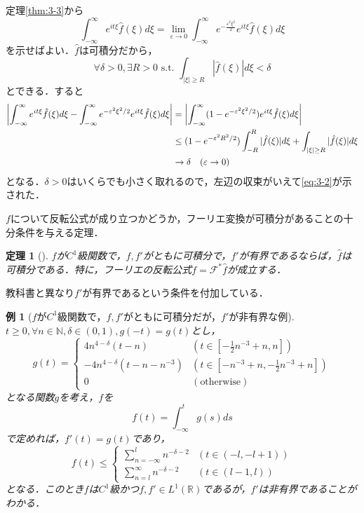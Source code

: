 \documentclass[dvipdfmx,a4j,10pt]{jsarticle}
\makeatletter
\theoremstyle{mystyle1}
\newtheorem{theorem}{定理}[section]
\theoremstyle{mystyle3}
\theoremstyle{mystyle4}
\theoremstyle{mystyle6}
\theoremstyle{mystyle2}
\newtheorem{ex*}{例}
\theoremstyle{mystyle5}
\renewenvironment{proof}[1][\proofname]{\par
  \pushQED{\qed}%
  \normalfont
  \topsep6\p@\@plus6\p@ \trivlist
  \item[\hskip\labelsep{\bfseries\sffamily #1}]\ignorespaces
}{%
  \popQED\endtrivlist\@endpefalse
}
\renewcommand\proofname{証明}
\newenvironment{thm}[1][]
{\begin{tcolorbox}[
    enhanced,
    boxrule=0pt,
    arc=0mm,
    frame hidden,
    borderline west={2pt}{-4pt}{red},
    breakable = true
    ]
    \begin{theorem}[#1]
}
{\end{theorem}\end{tcolorbox}}
\makeatother
\begin{document}
\begin{proof}
	定理\ref{thm:3-3}から
	\begin{equation}\label{eq:3-2}
		\int_{-\infty}^\infty e^{it\xi}\hat f(\xi)d\xi=\lim_{\varepsilon\to 0}\int_{-\infty}^\infty e^{-\frac{\varepsilon^2\xi^2}{2}}e^{it\xi}\hat{f}(\xi)d\xi
	\end{equation}
	を示せばよい．$\hat f$は可積分だから，
	\[
		\forall\delta>0,\exists R>0\,\,\textrm{s.t.}\,\,\int_{|\xi|\geq R}|\hat f(\xi)|	d\xi<\delta
	\]
	とできる．すると
	\[
		\begin{split}
			\mleft|\int_{-\infty}^\infty e^{it\xi}\hat f(\xi)d\xi-\int_{-\infty}^\infty e^{-\varepsilon^2\xi^2/2}e^{it\xi}\hat f(\xi)d\xi\mright|
			&=\mleft|\int_{-\infty}^\infty (1-e^{-\varepsilon^2\xi^2/2})e^{it\xi}\hat f(\xi)d\xi\mright| \\
			&\leq (1-e^{-\varepsilon^2R^2/2})\int_{-R}^R|\hat f(\xi)|d\xi+\int_{|\xi|\geq R}|\hat f(\xi)|d\xi \\
			&\to \delta \quad (\varepsilon\to 0)
		\end{split}
	\]
	となる．$\delta>0$はいくらでも小さく取れるので，左辺の収束がいえて\eqref{eq:3-2}が示された．
\end{proof}

$f$について反転公式が成り立つかどうか，フーリエ変換が可積分があることの十分条件を与える定理．

\begin{thm}\label{thm:3-6}
	$f$が$C^1$級関数で，$f,f'$がともに可積分で，$f'$が有界であるならば，$\hat f$は可積分である．特に，フーリエの反転公式$f=\mathcal{F}^*\hat f$が成立する．
\end{thm}

教科書と異なり$f'$が有界であるという条件を付加している．

\begin{ex*}[$f$が$C^1$級関数で，$f,f'$がともに可積分だが，$f'$が非有界な例]
	$t\geq 0,\forall n\in\mathbb{N},\delta\in (0,1),g(-t)=g(t)$とし，
	\[
		g(t)=\begin{cases}
			4n^{4-\delta}(t-n)         & (t\in [-\frac{1}{2}n^{-3}+n,n])         \\
			-4n^{4-\delta}(t-n-n^{-3}) & (t\in [-n^{-3}+n,-\frac{1}{2}n^{-3}+n]) \\
			0                          & (\textrm{otherwise})
		\end{cases}
	\]
	となる関数$g$を考え，$f$を
	\[
		f(t)=\int_{-\infty}^t g(s)ds
	\]
	で定めれば，$f'(t)=g(t)$であり，
	\[
		f(t)\leq\begin{cases}
			\sum_{n=-\infty}^l n^{-\delta-2} & (t\in (-l,-l+1)) \\
			\sum_{n=l}^\infty n^{-\delta-2}  & (t\in (l-1,l))
		\end{cases}
	\]
	となる．このとき$f$は$C^1$級かつ$f,f'\in L^1(\mathbb{R})$であるが，$f'$は非有界であることがわかる．
\end{ex*}
\end{document}
